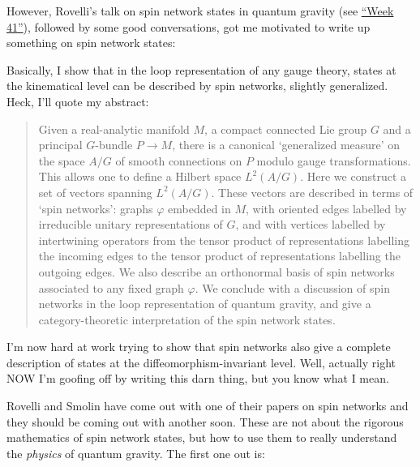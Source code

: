 \documentclass[12pt]{article}
\def\tightlist{}
\renewcommand{\texttt}[1]{%
  \begingroup
  \ttfamily
  \begingroup\lccode`~=`/\lowercase{\endgroup\def~}{/\discretionary{}{}{}}%
  \begingroup\lccode`~=`[\lowercase{\endgroup\def~}{[\discretionary{}{}{}}%
  \begingroup\lccode`~=`.\lowercase{\endgroup\def~}{.\discretionary{}{}{}}%
  \catcode`/=\active\catcode`[=\active\catcode`.=\active
  \scantokens{#1\noexpand}%
  \endgroup
}
\begin{document}
However, Rovelli's talk on spin network states in quantum gravity (see
\protect\hyperlink{week41}{``Week 41''}), followed by some good
conversations, got me motivated to write up something on spin network
states:

\noindent
Basically, I show that in the loop representation of any gauge theory,
states at the kinematical level can be described by spin networks,
slightly generalized. Heck, I'll quote my abstract:

\begin{quote}
Given a real-analytic manifold \(M\), a compact connected Lie group
\(G\) and a principal \(G\)-bundle \(P \to M\), there is a canonical
`generalized measure' on the space \(A/G\) of smooth connections on
\(P\) modulo gauge transformations. This allows one to define a Hilbert
space \(L^2(A/G)\). Here we construct a set of vectors spanning
\(L^2(A/G)\). These vectors are described in terms of `spin networks':
graphs \(\varphi\) embedded in \(M\), with oriented edges labelled by
irreducible unitary representations of \(G\), and with vertices labelled
by intertwining operators from the tensor product of representations
labelling the incoming edges to the tensor product of representations
labelling the outgoing edges. We also describe an orthonormal basis of
spin networks associated to any fixed graph \(\varphi\). We conclude
with a discussion of spin networks in the loop representation of quantum
gravity, and give a category-theoretic interpretation of the spin
network states.
\end{quote}

I'm now hard at work trying to show that spin networks also give a
complete description of states at the diffeomorphism-invariant level.
Well, actually right NOW I'm goofing off by writing this darn thing, but
you know what I mean.

Rovelli and Smolin have come out with one of their papers on spin
networks and they should be coming out with another soon. These are not
about the rigorous mathematics of spin network states, but how to use
them to really understand the \emph{physics} of quantum gravity. The
first one out is:
\end{document}
